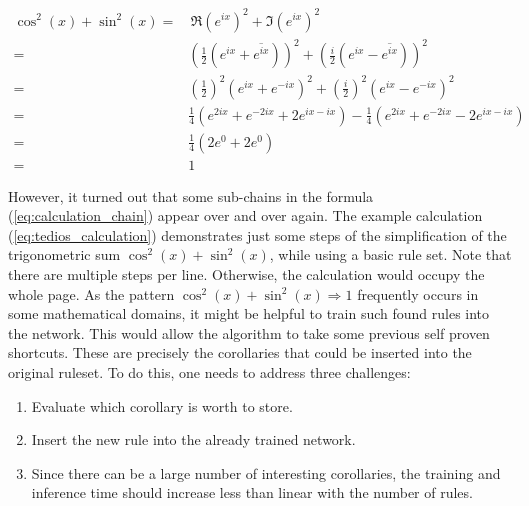 \documentclass{scrartcl}
\theoremstyle{definition}
\begin{document}
\begin{equation}
	\label{eq:tedios_calculation}
	\begin{aligned}
		\cos^2(x)+\sin^2(x) = &\, \Re\left(e^{ix}\right)^2+\Im\left(e^{ix}\right)^2 \\
		= & \left(\frac{1}{2} \left(e^{ix}+\overline{e^{ix}}\right)\right)^2 + \left(\frac{i}{2} \left(e^{ix}-\overline{e^{ix}}\right)\right)^2 \\
		= & \left(\frac{1}{2}\right)^2 \left(e^{ix}+e^{-ix}\right)^2 + \left(\frac{i}{2}\right)^2 \left(e^{ix}-e^{-ix}\right)^2 \\
		= & \frac{1}{4} \left(e^{2ix}+e^{-2ix}+2e^{ix-ix}\right) - \frac{1}{4} \left(e^{2ix}+e^{-2ix}-2e^{ix-ix}\right) \\
		= & \frac{1}{4} \left( 2e^0+2e^0 \right) \\
		= & 1
	\end{aligned}
\end{equation}

However, it turned out that some sub-chains in the formula (\ref{eq:calculation_chain}) appear over and over again.
The example calculation (\ref{eq:tedios_calculation}) demonstrates just some steps of the simplification of the trigonometric sum $\cos^2(x)+\sin^2(x)$, while using a basic rule set.
Note that there are multiple steps per line. Otherwise, the calculation would occupy the whole page.
As the pattern $\cos^2(x)+\sin^2(x) \Longrightarrow 1$ frequently occurs in some mathematical domains, it might be helpful to train such found rules into the network.
This would allow the algorithm to take some previous self proven shortcuts.
These are precisely the corollaries that could be inserted into the original ruleset.
To do this, one needs to address three challenges:

\begin{enumerate}[label=(\roman*)]
	\item Evaluate which corollary is worth to store.
	\item Insert the new rule into the already trained network.
	\item Since there can be a large number of interesting corollaries, the training and inference time should increase less than linear with the number of rules.
\end{enumerate}
\end{document}
